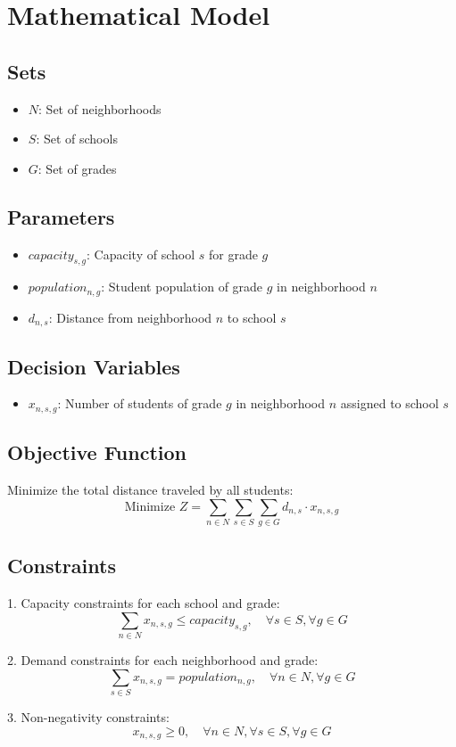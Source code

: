 \documentclass{article}
\begin{document}
\section*{Mathematical Model}

\subsection*{Sets}
\begin{itemize}
    \item \(N\): Set of neighborhoods
    \item \(S\): Set of schools
    \item \(G\): Set of grades
\end{itemize}

\subsection*{Parameters}
\begin{itemize}
    \item \(capacity_{s,g}\): Capacity of school \(s\) for grade \(g\)
    \item \(population_{n,g}\): Student population of grade \(g\) in neighborhood \(n\)
    \item \(d_{n,s}\): Distance from neighborhood \(n\) to school \(s\)
\end{itemize}

\subsection*{Decision Variables}
\begin{itemize}
    \item \(x_{n,s,g}\): Number of students of grade \(g\) in neighborhood \(n\) assigned to school \(s\)
\end{itemize}

\subsection*{Objective Function}
Minimize the total distance traveled by all students:
\[
\text{Minimize } Z = \sum_{n \in N} \sum_{s \in S} \sum_{g \in G} d_{n,s} \cdot x_{n,s,g}
\]

\subsection*{Constraints}
1. Capacity constraints for each school and grade:
\[
\sum_{n \in N} x_{n,s,g} \leq capacity_{s,g}, \quad \forall s \in S, \forall g \in G
\]

2. Demand constraints for each neighborhood and grade:
\[
\sum_{s \in S} x_{n,s,g} = population_{n,g}, \quad \forall n \in N, \forall g \in G
\]

3. Non-negativity constraints:
\[
x_{n,s,g} \geq 0, \quad \forall n \in N, \forall s \in S, \forall g \in G
\]
\end{document}
